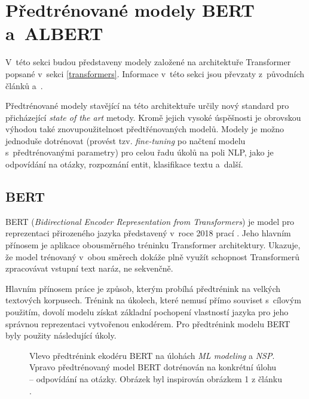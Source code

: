 \section{Předtrénované modely BERT a~ALBERT}
\label{bert_albert}

V~této sekci budou představeny modely založené na architektuře Transformer popsané v~sekci \ref{transformers}. Informace v~této sekci jsou převzaty z~původních článků \cite{BERT} a~\cite{ALBERT}.\par
Předtrénované modely stavějící na této architektuře určily nový standard pro přicházející \textit{state of the art} metody. Kromě jejich vysoké úspěšnosti je obrovskou výhodou také znovupoužitelnost předtřénovaných modelů. Modely je možno jednoduše dotrénovat (provést tzv. \emph{fine-tuning} po načtení modelu s~předtrénovanými parametry) pro celou řadu úkolů na poli NLP, jako je odpovídání na otázky, rozpoznání entit, klasifikace textu a~další.

\subsection{BERT}
BERT (\textit{Bidirectional Encoder Representation from Transformers}) je model pro reprezentaci přirozeného jazyka představený v~roce 2018 prací \cite{BERT}. Jeho hlavním přínosem je aplikace obousměrného tréninku Transformer architektury. Ukazuje, že model trénovaný v~obou směrech dokáže plně využít schopnost Transformerů zpracovávat vstupní text naráz, ne sekvenčně.\par\smallskip
Hlavním přínosem práce \cite{BERT} je způsob, kterým probíhá předtrénink na velkých textových korpusech. Trénink na úkolech, které nemusí přímo souviset s~cílovým použitím, dovolí modelu získat základní pochopení vlastností jazyka pro jeho správnou reprezentaci vytvořenou enkodérem. Pro předtrénink modelu BERT byly použity následující úkoly.

\begin{figure}[hbt]
	\centering
	\caption{Vlevo předtrénink ekodéru BERT na úlohách \emph{ML modeling} a \emph{NSP}. Vpravo předtrénovaný model BERT dotrénován na konkrétní úlohu -- odpovídání na otázky. Obrázek byl inspirován obrázkem 1 z článku \cite{BERT}.}
	\label{bert}
\end{figure}

